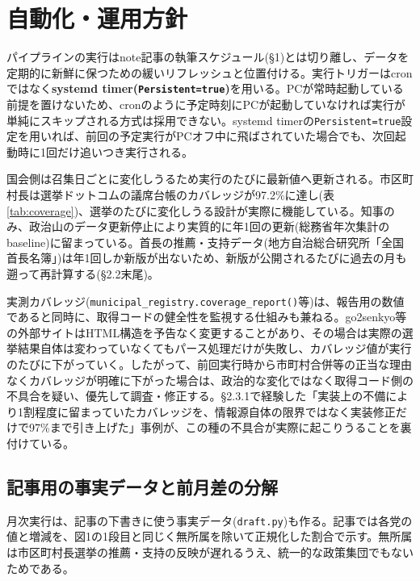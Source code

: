 \documentclass[a4paper,11pt]{ltjsarticle}
\begin{document}
\section{自動化・運用方針}

パイプラインの実行はnote記事の執筆スケジュール(\S1)とは切り離し、データを定期的に新鮮に保つための緩いリフレッシュと位置付ける。実行トリガーはcronではなく\textbf{systemd timer(\texttt{Persistent=true})}を用いる。PCが常時起動している前提を置けないため、cronのように予定時刻にPCが起動していなければ実行が単純にスキップされる方式は採用できない。systemd timerの\texttt{Persistent=true}設定を用いれば、前回の予定実行がPCオフ中に飛ばされていた場合でも、次回起動時に1回だけ追いつき実行される。

国会側は召集日ごとに変化しうるため実行のたびに最新値へ更新される。市区町村長は選挙ドットコムの議席台帳のカバレッジが97.2\%に達し(表\ref{tab:coverage})、選挙のたびに変化しうる設計が実際に機能している。知事のみ、政治山のデータ更新停止により実質的に年1回の更新(総務省年次集計のbaseline)に留まっている。首長の推薦・支持データ(地方自治総合研究所「全国首長名簿」)は年1回しか新版が出ないため、新版が公開されるたびに過去の月も遡って再計算する(\S2.2末尾)。

実測カバレッジ(\texttt{municipal\_registry.coverage\_report()}等)は、報告用の数値であると同時に、取得コードの健全性を監視する仕組みも兼ねる。go2senkyo等の外部サイトはHTML構造を予告なく変更することがあり、その場合は実際の選挙結果自体は変わっていなくてもパース処理だけが失敗し、カバレッジ値が実行のたびに下がっていく。したがって、前回実行時から市町村合併等の正当な理由なくカバレッジが明確に下がった場合は、政治的な変化ではなく取得コード側の不具合を疑い、優先して調査・修正する。\S2.3.1で経験した「実装上の不備により1割程度に留まっていたカバレッジを、情報源自体の限界ではなく実装修正だけで97\%まで引き上げた」事例が、この種の不具合が実際に起こりうることを裏付けている。

\subsection{記事用の事実データと前月差の分解}
\label{sec:attribution}

月次実行は、記事の下書きに使う事実データ(\texttt{draft.py})も作る。記事では各党の値と増減を、図1の1段目と同じく無所属を除いて正規化した割合で示す。無所属は市区町村長選挙の推薦・支持の反映が遅れるうえ、統一的な政策集団でもないためである。
\end{document}
